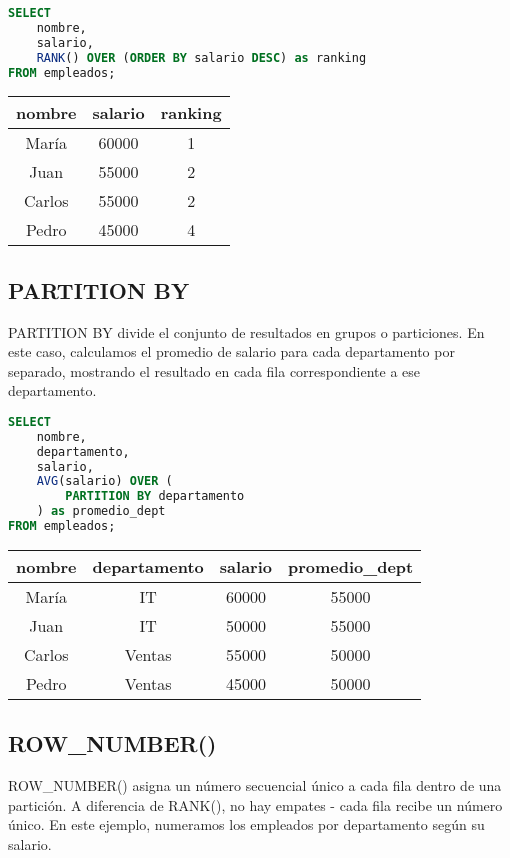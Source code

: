 \documentclass[12pt]{article}
\begin{document}
\begin{lstlisting}[language=SQL]
SELECT 
    nombre,
    salario,
    RANK() OVER (ORDER BY salario DESC) as ranking
FROM empleados;
\end{lstlisting}

\begin{center}
\begin{tabular}{ccc}
\toprule
nombre & salario & ranking \\
\midrule
María & 60000 & 1 \\
Juan & 55000 & 2 \\
Carlos & 55000 & 2 \\
Pedro & 45000 & 4 \\
\bottomrule
\end{tabular}
\end{center}

\subsection{PARTITION BY}
PARTITION BY divide el conjunto de resultados en grupos o particiones. En este caso, calculamos el promedio de salario para cada departamento por separado, mostrando el resultado en cada fila correspondiente a ese departamento.

\begin{lstlisting}[language=SQL]
SELECT 
    nombre,
    departamento,
    salario,
    AVG(salario) OVER (
        PARTITION BY departamento
    ) as promedio_dept
FROM empleados;
\end{lstlisting}

\begin{center}
\begin{tabular}{cccc}
\toprule
nombre & departamento & salario & promedio\_dept \\
\midrule
María & IT & 60000 & 55000 \\
Juan & IT & 50000 & 55000 \\
Carlos & Ventas & 55000 & 50000 \\
Pedro & Ventas & 45000 & 50000 \\
\bottomrule
\end{tabular}
\end{center}

\subsection{ROW\_NUMBER()}
ROW\_NUMBER() asigna un número secuencial único a cada fila dentro de una partición. A diferencia de RANK(), no hay empates - cada fila recibe un número único. En este ejemplo, numeramos los empleados por departamento según su salario.
\end{document}

